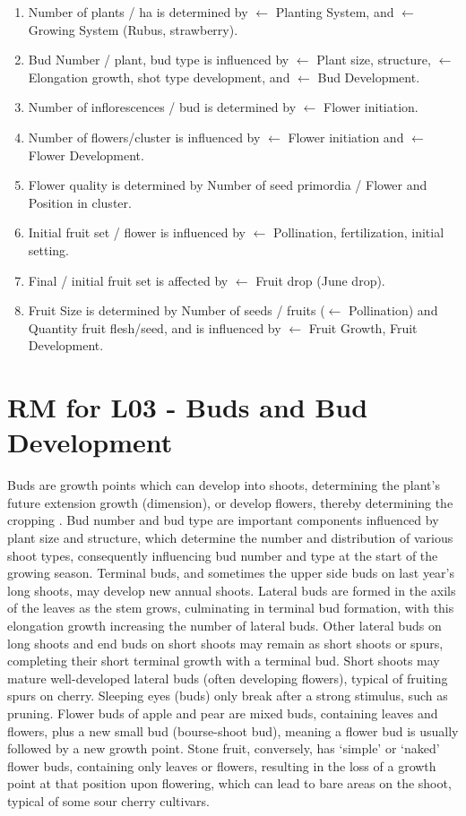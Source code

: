 \begin{enumerate} 
    \item Number of plants / ha is determined by $\leftarrow$ Planting System, and $\leftarrow$ Growing System (Rubus, strawberry). 
    \item Bud Number / plant, bud type is influenced by $\leftarrow$ Plant size, structure, $\leftarrow$ Elongation growth, shot type development, and $\leftarrow$ Bud Development. 
    \item Number of inflorescences / bud is determined by $\leftarrow$ Flower initiation. 
    \item Number of flowers/cluster is influenced by $\leftarrow$ Flower initiation and $\leftarrow$ Flower Development. 
    \item Flower quality is determined by Number of seed primordia / Flower and Position in cluster. 
    \item Initial fruit set / flower is influenced by $\leftarrow$ Pollination, fertilization, initial setting. 
    \item Final / initial fruit set is affected by $\leftarrow$ Fruit drop (June drop). 
    \item Fruit Size is determined by Number of seeds / fruits ($\leftarrow$ Pollination) and Quantity fruit flesh/seed, and is influenced by $\leftarrow$ Fruit Growth, Fruit Development. 
\end{enumerate}


\section{RM for L03 - Buds and Bud Development}

Buds are growth points which can develop into shoots, determining the plant's future extension growth (dimension), or develop flowers, thereby determining the cropping \cite*{rm_02_L03_buds_bud_development}. Bud number and bud type are important components influenced by plant size and structure, which determine the number and distribution of various shoot types, consequently influencing bud number and type at the start of the growing season. Terminal buds, and sometimes the upper side buds on last year’s long shoots, may develop new annual shoots. Lateral buds are formed in the axils of the leaves as the stem grows, culminating in terminal bud formation, with this elongation growth increasing the number of lateral buds. Other lateral buds on long shoots and end buds on short shoots may remain as short shoots or spurs, completing their short terminal growth with a terminal bud. Short shoots may mature well-developed lateral buds (often developing flowers), typical of fruiting spurs on cherry. Sleeping eyes (buds) only break after a strong stimulus, such as pruning. Flower buds of apple and pear are mixed buds, containing leaves and flowers, plus a new small bud (bourse-shoot bud), meaning a flower bud is usually followed by a new growth point. Stone fruit, conversely, has ‘simple’ or ‘naked’ flower buds, containing only leaves or flowers, resulting in the loss of a growth point at that position upon flowering, which can lead to bare areas on the shoot, typical of some sour cherry cultivars.

